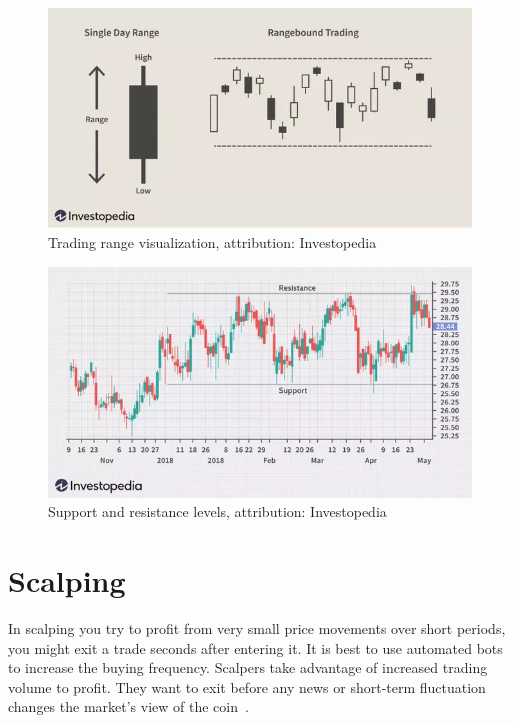 \begin{figure}[!hbt]
    \centering
    \includegraphics[width=\columnwidth]{figures/trading-range.png}
    \caption{Trading range visualization, attribution: Investopedia~\cite{investopedia:trading-range}}
    \label{trading-range-figure}
\end{figure}

\begin{figure}[!hbt]
    \centering
    \includegraphics[width=\columnwidth]{figures/dotdash-final-trading-range.png}
    \caption{Support and resistance levels, attribution: Investopedia~\cite{investopedia:trading-range}}
    \label{sup-and-res-levels}
\end{figure}

\section{Scalping}
\label{section-scalping}
In scalping you try to profit from very small price movements over short periods, you might exit a trade seconds after entering it. It is best to use automated bots to increase the buying frequency. Scalpers take advantage of increased trading volume to profit. They want to exit before any news or short-term fluctuation changes the market's view of the coin~\cite{best-crypto-daytrading}.

